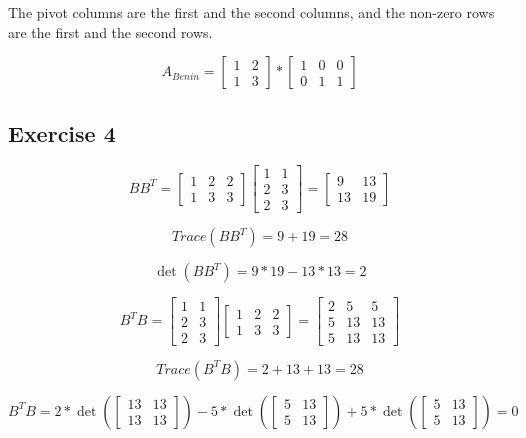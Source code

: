 \documentclass{article}
\begin{document}
The pivot columns are the first and the second columns, and the non-zero rows are the first and the second rows.

\[A_{Benin} =
    \begin{bmatrix}
        1 & 2 \\
        1 & 3
    \end{bmatrix}
    *
    \begin{bmatrix}
        1 & 0 & 0 \\
        0 & 1 & 1
    \end{bmatrix}
\]

\subsection{Exercise 4}
\[
    BB^{T} =
    \begin{bmatrix}
        1 & 2 & 2 \\
        1 & 3 & 3
    \end{bmatrix}
    \begin{bmatrix}
        1 & 1 \\
        2 & 3 \\
        2 & 3
    \end{bmatrix}
    = \begin{bmatrix}
        9  & 13 \\
        13 & 19
    \end{bmatrix}
\]

\[
    Trace(BB^{T}) = 9 + 19 = 28
\]

\[
    \det(BB^{T}) = 9 * 19 - 13 * 13 = 2
\]

\[
    B^{T}B =
    \begin{bmatrix}
        1 & 1 \\
        2 & 3 \\
        2 & 3
    \end{bmatrix}
    \begin{bmatrix}
        1 & 2 & 2 \\
        1 & 3 & 3
    \end{bmatrix}
    = \begin{bmatrix}
        2 & 5  & 5  \\
        5 & 13 & 13 \\
        5 & 13 & 13
    \end{bmatrix}
\]

\[
    Trace(B^{T}B) = 2 + 13 + 13 = 28
\]

\[
    B^{T}B = 2 * \det(\begin{bmatrix} 13 & 13 \\ 13 & 13 \end{bmatrix}) - 5 * \det(\begin{bmatrix} 5 & 13 \\ 5 & 13 \end{bmatrix}) + 5 * \det(\begin{bmatrix} 5 & 13 \\ 5 & 13 \end{bmatrix}) = 0
\]
\end{document}
